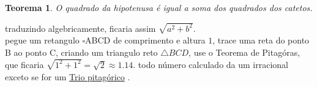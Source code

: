 \documentclass[a4paper]{article}
\newtheorem{theorem}{Teorema}
\begin{document}
\begin{theorem}
O quadrado da hipotenusa é igual a soma dos quadrados dos catetos.
\end{theorem}

traduzindo algebricamente, ficaria assim $\sqrt{a^2+b^2}$.\\

pegue um retangulo $\square$ABCD de comprimento e altura $1$, trace uma reta do ponto B ao ponto C, criando um triangulo reto $\triangle BCD$, use o Teorema de Pitagóras, que ficaria
$\sqrt{1^2+1^2}= \sqrt{2} \approx 1.14$. todo número calculado da um irracional exceto se for um \href{https://en.wikipedia.org/wiki/Pythagorean_triple}{Trio pitagórico} . \\

\centering
{}
\end{document}
